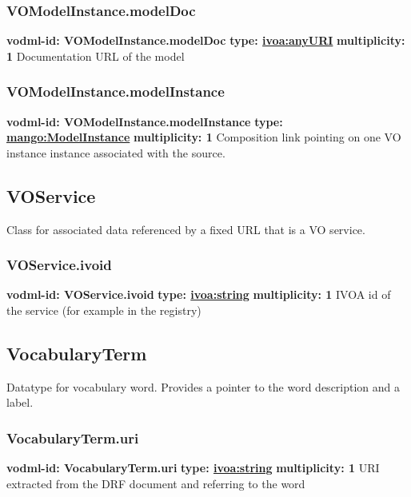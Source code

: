     \subsubsection{VOModelInstance.modelDoc}
      \textbf{vodml-id: VOModelInstance.modelDoc} \newline
      \textbf{type: \hyperref[sect:ivoa]{ivoa:anyURI}} \newline
      \textbf{multiplicity: 1} \newline 
      Documentation URL of the model

    \subsubsection{VOModelInstance.modelInstance}
      \textbf{vodml-id: VOModelInstance.modelInstance} \newline
      \textbf{type: \hyperref[sect:ModelInstance]{mango:ModelInstance}} \newline
      \textbf{multiplicity: 1} \newline 
      Composition link pointing on one VO instance instance associated with the source.

  \subsection{VOService}
  \label{sect:VOService}
    Class for associated data referenced by a fixed URL that is a VO service.

    \subsubsection{VOService.ivoid}
      \textbf{vodml-id: VOService.ivoid} \newline
      \textbf{type: \hyperref[sect:ivoa]{ivoa:string}} \newline
      \textbf{multiplicity: 1} \newline 
      IVOA id of the service (for example in the registry)

  \subsection{VocabularyTerm}
  \label{sect:VocabularyTerm}
    Datatype for vocabulary word. Provides a pointer to the word description and a label.

    \subsubsection{VocabularyTerm.uri}
      \textbf{vodml-id: VocabularyTerm.uri} \newline
      \textbf{type: \hyperref[sect:ivoa]{ivoa:string}} \newline
      \textbf{multiplicity: 1} \newline 
      URI extracted from the DRF document and referring to the word


